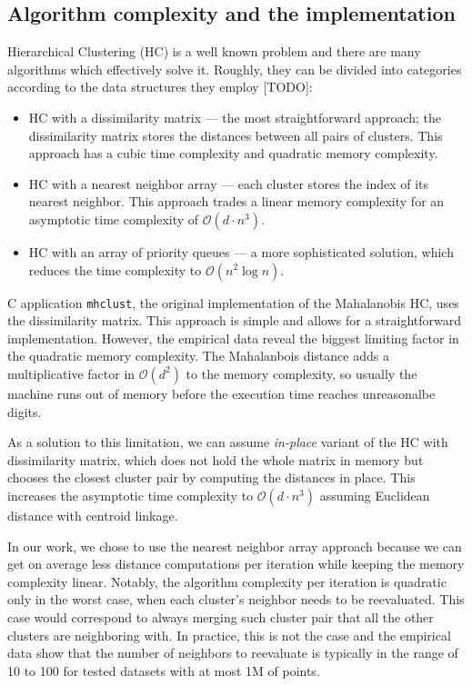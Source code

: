 \subsection{Algorithm complexity and the implementation}

Hierarchical Clustering (HC) is a well known problem and there are many algorithms which effectively solve it. Roughly, they can be divided into categories according to the data structures they employ [TODO]:
\begin{itemize}
    \item HC with a dissimilarity matrix --- the most straightforward approach; the dissimilarity matrix stores the distances between all pairs of clusters. This approach has a cubic time complexity and quadratic memory complexity.
    \item HC with a nearest neighbor array --- each cluster stores the index of its nearest neighbor. This approach trades a linear memory complexity for an asymptotic time complexity of $\mathcal{O}(d \cdot n^3)$.
    \item HC with an array of priority queues --- a more sophisticated solution, which reduces the time complexity to $\mathcal{O}(n^2 \log n)$.
\end{itemize}

C application \texttt{mhclust}, the original implementation of the Mahalanobis HC, uses the dissimilarity matrix. This approach is simple and allows for a straightforward implementation. However, the empirical data reveal the biggest limiting factor in the quadratic memory complexity. The Mahalanbois distance adds a multiplicative factor in $\mathcal{O}(d^2)$ to the memory complexity, so usually the machine runs out of memory before the execution time reaches unreasonalbe digits.

As a solution to this limitation, we can assume \emph{in-place} variant of the HC with dissimilarity matrix, which does not hold the whole matrix in memory but chooses the closest cluster pair by computing the distances in place. This increases the asymptotic time complexity to $\mathcal{O}(d \cdot n^3)$ assuming Euclidean distance with centroid linkage.

In our work, we chose to use the nearest neighbor array approach because we can get on average less distance computations per iteration while keeping the memory complexity linear. Notably, the algorithm complexity per iteration is quadratic only in the worst case, when each cluster's neighbor needs to be reevaluated. This case would correspond to always merging such cluster pair that all the other clusters are neighboring with. In practice, this is not the case and the empirical data show that the number of neighbors to reevaluate is typically in the range of 10 to 100 for tested datasets with at most 1M of points.

